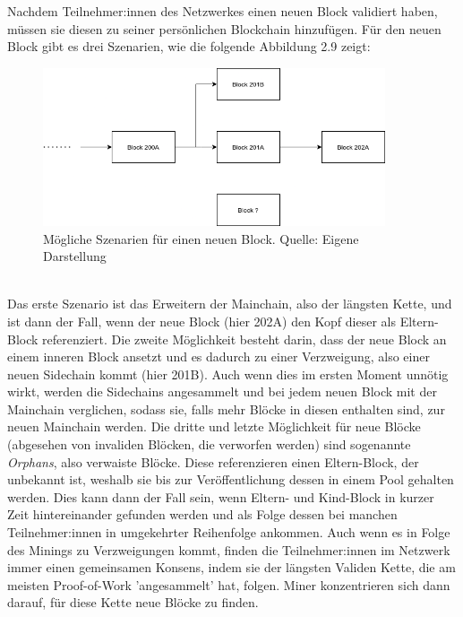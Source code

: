 Nachdem Teilnehmer:innen des Netzwerkes einen neuen Block validiert haben, müssen sie diesen zu seiner persönlichen Blockchain hinzufügen. Für den neuen Block gibt es drei Szenarien, wie die folgende Abbildung 2.9 zeigt:
\begin{figure}[htpb]
	\centering
	\includegraphics[width=0.9\textwidth]{images/chains.png}
	\caption{Mögliche Szenarien für einen neuen Block.
	Quelle: Eigene Darstellung}
	\label{6braun:fig:chains}
\end{figure}\\
Das erste Szenario ist das Erweitern der Mainchain, also der längsten Kette, und ist dann der Fall, wenn der neue Block (hier 202A) den Kopf dieser als Eltern-Block referenziert.
Die zweite Möglichkeit besteht darin, dass der neue Block an einem inneren Block ansetzt und es dadurch zu einer Verzweigung, also einer neuen Sidechain kommt (hier 201B). Auch wenn dies im ersten Moment unnötig wirkt, werden die Sidechains angesammelt und bei jedem neuen Block mit der Mainchain verglichen, sodass sie, falls mehr Blöcke in diesen enthalten sind, zur neuen Mainchain werden.
Die dritte und letzte Möglichkeit für neue Blöcke (abgesehen von invaliden Blöcken, die verworfen werden) sind sogenannte \emph{Orphans}, also verwaiste Blöcke. Diese referenzieren einen Eltern-Block, der unbekannt ist, weshalb sie bis zur Veröffentlichung dessen in einem Pool gehalten werden. Dies kann dann der Fall sein, wenn Eltern- und Kind-Block in kurzer Zeit hintereinander gefunden werden und als Folge dessen bei manchen Teilnehmer:innen in umgekehrter Reihenfolge ankommen. Auch wenn es in Folge des Minings zu Verzweigungen kommt, finden die Teilnehmer:innen im Netzwerk immer einen gemeinsamen Konsens, indem sie der längsten Validen Kette, die am meisten Proof-of-Work 'angesammelt' hat, folgen. Miner konzentrieren sich dann darauf, für diese Kette neue Blöcke zu finden.\\

